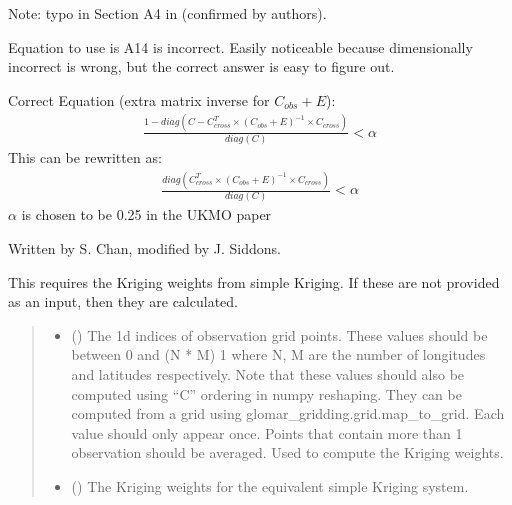 \documentclass[letterpaper,10pt,english]{sphinxmanual}
\begin{document}
\begin{fulllineitems}
\begin{fulllineitems}
\sphinxAtStartPar
Note: typo in Section A4 in  (confirmed by authors).

\sphinxAtStartPar
Equation to use is A14 is incorrect. Easily noticeable because
dimensionally incorrect is wrong, but the correct answer is easy to
figure out.

\sphinxAtStartPar
Correct Equation (extra matrix inverse for \(C_{obs} + E\)):
\begin{equation*}
\begin{split}\frac{
    1 - diag(C - C_{cross}^T \times (C_{obs} + E)^{-1}
             \times C_{cross})
}{diag(C)} < \alpha\end{split}
\end{equation*}
\sphinxAtStartPar
This can be re\sphinxhyphen{}written as:
\begin{equation*}
\begin{split}\frac{
    diag(C_{cross}^T \times (C_{obs} + E)^{-1} \times C_{cross})
}{diag(C)} < \alpha\end{split}
\end{equation*}
\sphinxAtStartPar
\(\alpha\) is chosen to be 0.25 in the UKMO paper

\sphinxAtStartPar
Written by S. Chan, modified by J. Siddons.

\sphinxAtStartPar
This requires the Kriging weights from simple Kriging. If these are
not provided as an input, then they are calculated.
\begin{quote}\begin{description}
\begin{itemize}
\item {}
\sphinxAtStartPar
{} () \textendash{} The 1d indices of observation grid points. These values should be
between 0 and (N * M) \sphinxhyphen{} 1 where N, M are the number of longitudes
and latitudes respectively. Note that these values should also be
computed using “C” ordering in numpy reshaping. They can be
computed from a grid using glomar\_gridding.grid.map\_to\_grid. Each
value should only appear once. Points that contain more than 1
observation should be averaged. Used to compute the Kriging weights.

\item {}
\sphinxAtStartPar
{} (\sphinxstyleliteralemphasis{\sphinxupquote{ | }}\sphinxstyleliteralemphasis{\sphinxupquote{,}}) \textendash{} The Kriging weights for the equivalent simple Kriging system.


\end{itemize}
\end{description}
\end{quote}
\end{fulllineitems}
\end{fulllineitems}
\end{document}
